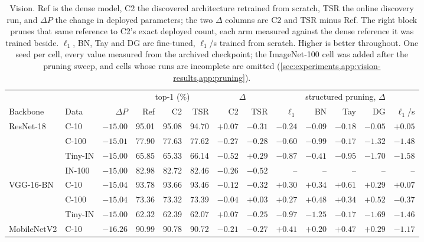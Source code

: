 \documentclass[10pt]{article}
\theoremstyle{paper}
\begin{document}
\begin{table}[t]
\centering
\caption{Vision. Ref is the dense model, C2 the discovered architecture retrained from scratch, TSR the online discovery run, and $\Delta P$ the change in deployed parameters; the two $\Delta$ columns are C2 and TSR minus Ref. The right block prunes that same reference to C2's exact deployed count, each arm measured against the dense reference it was trained beside. $\ell_1$, BN, Tay and DG are fine-tuned, $\ell_1$/s trained from scratch. Higher is better throughout. One seed per cell, every value measured from the archived checkpoint; the ImageNet-100 cell was added after the pruning sweep, and cells whose runs are incomplete are omitted (\cref{sec:experiments,app:vision-results,app:pruning}).}
\label{tab:vision}
\scriptsize
\setlength{\tabcolsep}{2.2pt}
\begin{tabular}{@{}llrrrrrrrrrrr@{}}
\toprule
& & & \multicolumn{3}{c}{top-1 (\%)} & \multicolumn{2}{c}{$\Delta$} & \multicolumn{5}{c}{structured pruning, $\Delta$} \\
\cmidrule(lr){4-6}\cmidrule(lr){7-8}\cmidrule(lr){9-13}
Backbone & Data & $\Delta P$ & Ref & C2 & TSR & C2 & TSR & $\ell_1$ & BN & Tay & DG & $\ell_1$/s \\
\midrule
ResNet-18 & C-10   & $-15.00$ & 95.01 & 95.08 & 94.70 & $+0.07$ & $-0.31$ & $-0.24$ & $-0.09$ & $-0.18$ & $-0.05$ & $+0.05$ \\
          & C-100  & $-15.01$ & 77.90 & 77.63 & 77.62 & $-0.27$ & $-0.28$ & $-0.60$ & $-0.99$ & $-0.17$ & $-1.32$ & $-1.48$ \\
          & Tiny-IN& $-15.00$ & 65.85 & 65.33 & 66.14 & $-0.52$ & $+0.29$ & $-0.87$ & $-0.41$ & $-0.95$ & $-1.70$ & $-1.58$ \\
          & IN-100 & $-15.00$ & 82.98 & 82.72 & 82.46 & $-0.26$ & $-0.52$ & -- & -- & -- & -- & -- \\
\midrule
VGG-16-BN & C-10   & $-15.04$ & 93.78 & 93.66 & 93.46 & $-0.12$ & $-0.32$ & $+0.30$ & $+0.34$ & $+0.61$ & $+0.29$ & $+0.07$ \\
          & C-100  & $-15.04$ & 73.36 & 73.32 & 73.39 & $-0.04$ & $+0.03$ & $+0.27$ & $+0.48$ & $+0.34$ & $+0.52$ & $-0.37$ \\
          & Tiny-IN& $-15.00$ & 62.32 & 62.39 & 62.07 & $+0.07$ & $-0.25$ & $-0.97$ & $-1.25$ & $-0.17$ & $-1.69$ & $-1.46$ \\
\midrule
MobileNetV2& C-10  & $-16.26$ & 90.99 & 90.78 & 90.72 & $-0.21$ & $-0.27$ & $+0.41$ & $+0.20$ & $+0.47$ & $+0.29$ & $-1.17$ \\

\end{tabular}
\end{table}
\end{document}
